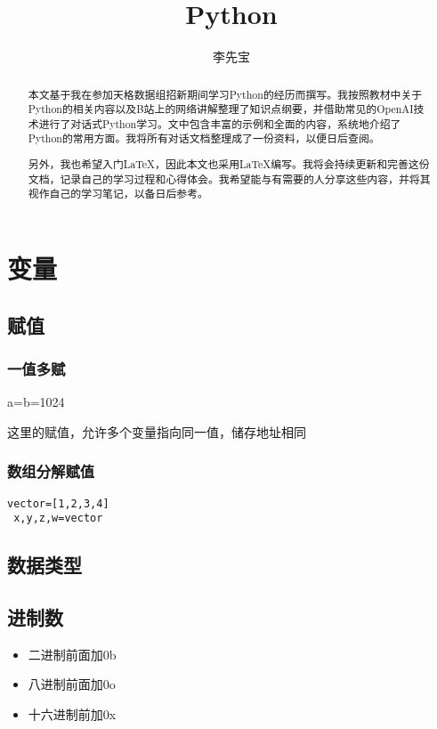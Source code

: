 \documentclass{article}
\date{}
\title{\heiti Python}
\author{\heiti 李先宝 }
\begin{document}
\maketitle

\begin{abstract}
    本文基于我在参加天格数据组招新期间学习Python的经历而撰写。我按照教材中关于Python的相关内容以及B站上的网络讲解整理了知识点纲要，并借助常见的OpenAI技术进行了对话式Python学习。文中包含丰富的示例和全面的内容，系统地介绍了Python的常用方面。我将所有对话文档整理成了一份资料，以便日后查阅。

另外，我也希望入门LaTeX，因此本文也采用LaTeX编写。我将会持续更新和完善这份文档，记录自己的学习过程和心得体会。我希望能与有需要的人分享这些内容，并将其视作自己的学习笔记，以备日后参考。
\end{abstract}
\tableofcontents %
\section{变量}
\subsection{赋值}
\subsubsection{一值多赋}
a=b=1024

这里的赋值，允许多个变量指向同一值，储存地址相同
\subsubsection{数组分解赋值}
\begin{lstlisting}[caption={示例 Python 代码}]
 vector=[1,2,3,4]
 x,y,z,w=vector
\end{lstlisting}

\subsection{数据类型}
\subsection{进制数}


    \begin{itemize}
          \item 二进制前面加0b
          \item 八进制前面加0o
          \item 十六进制前加0x
        
      
    
          \end{itemize}
\end{document}
